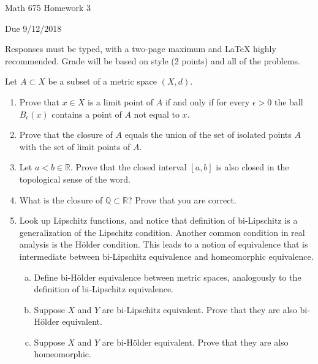 \documentclass[12pt,letterpaper,reqno]{amsart}
\newcommand{\R}{\mathbb R}
\newcommand{\Q}{\mathbb Q}
\begin{document}
\thispagestyle{empty}
\centerline{\Large Math 675 Homework 3}
\centerline{Due 9/12/2018}
\vspace{.25in}

Responses must be typed, with a two-page maximum and LaTeX highly recommended. Grade will be based on style (2 points) and all of the problems.

Let $A\subset X$ be a subset of a metric space $(X,d)$. 
\begin{enumerate}[1.]
\item Prove that $x\in X$ is a limit point of $A$ if and only if for every $\epsilon>0$ the ball $B_\epsilon(x)$ contains a point of $A$ not equal to $x$.
\item Prove that the closure of $A$ equals the union of the set of isolated points $A$ with the set of limit points of $A$.
\item Let $a<b\in \R$. Prove that the closed interval $[a,b]$ is also closed in the topological sense of the word.
\item What is the closure of $\Q\subset \R$? Prove that you are correct.
\item Look up Lipschitz functions, and notice that definition of bi-Lipschitz is a generalization of the Lipschitz condition. Another common condition in real analysis is the H\"older condition. This leads to a notion of equivalence that is intermediate between bi-Lipschitz equivalence and homeomorphic equivalence.
\begin{enumerate}[(a)]
\item Define bi-H\"older equivalence between metric spaces, analogously to the definition of bi-Lipschitz equivalence.
\item Suppose $X$ and $Y$ are bi-Lipschitz equivalent. Prove that they are also bi-H\"older equivalent.
\item Suppose $X$ and $Y$ are bi-H\"older equivalent. Prove that they are also homeomorphic.
\end{enumerate}
\end{enumerate}
\end{document}
